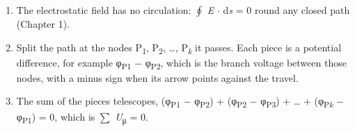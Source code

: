 \documentclass[11pt]{article}
\begin{document}
\begin{keepsection}
\begin{keepsection}
\begin{enumerate}
\item The electrostatic field has no circulation: $\oint $ \textit{E} \ensuremath{\cdot} d\textit{s} = 0 round any closed path (Chapter 1).
\item Split the path at the nodes P\textsubscript{1}, P\textsubscript{2}, …, P\textsubscript{\textit{k}} it passes. Each piece is a potential difference, for example φ\textsubscript{P1} \ensuremath{-} φ\textsubscript{P2}, which is the branch voltage between those nodes, with a minus sign when its arrow points against the travel.
\item The sum of the pieces telescopes, (φ\textsubscript{P1} \ensuremath{-} φ\textsubscript{P2}) + (φ\textsubscript{P2} \ensuremath{-} φ\textsubscript{P3}) + … + (φ\textsubscript{P\textit{k}} \ensuremath{-} φ\textsubscript{P1}) = 0, which is \ensuremath{\textstyle\sum} \textit{U}\textsubscript{μ} = 0.
\end{enumerate}


\end{keepsection}
\end{keepsection}
\end{document}

